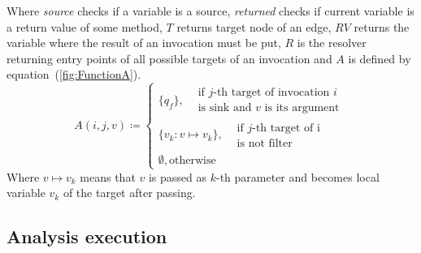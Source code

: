 Where \textit{source} checks if a variable is a source, \textit{returned} checks if current variable is a return value of some method, $T$ returns target node of an edge, $RV$ returns the variable where the result of an invocation must be put, $R$ is the resolver returning entry points of all possible targets of an invocation and $A$ is defined by equation~(\ref{fig:FunctionA}).
\begin{equation}
	\label{fig:FunctionA}
	A(i, j, v) \coloneqq 
	\begin{cases}
		\{q_f\},  \begin{split}&\textrm{if $j$-th target of invocation $i$} \\ & \textrm{is sink and $v$ is its argument}\end{split} \\
			\{v_k: v \mapsto v_k\}, \begin{split}&\textrm{if $j$-th target of i} \\ & \textrm{is not filter}\end{split} \\
		\emptyset, \textrm{otherwise}
	\end{cases}
\end{equation}
Where $v \mapsto v_k$ means that $v$ is passed as $k$-th parameter and becomes local variable $v_k$ of the target after passing.

\subsection{Analysis execution}

